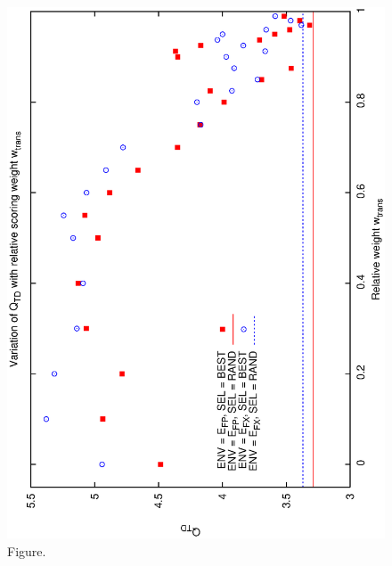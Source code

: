 \documentclass[12pt,a4paper]{article}
\begin{document}
\begin{figure}[htbp]
 \begin{center}
  \includegraphics[scale=1.0, angle=0]{figures/cs1_dw1a2_td.eps}
 \end{center}
  \caption[Figure.]
{Figure.}
\end{figure}
\clearpage
\end{document}
